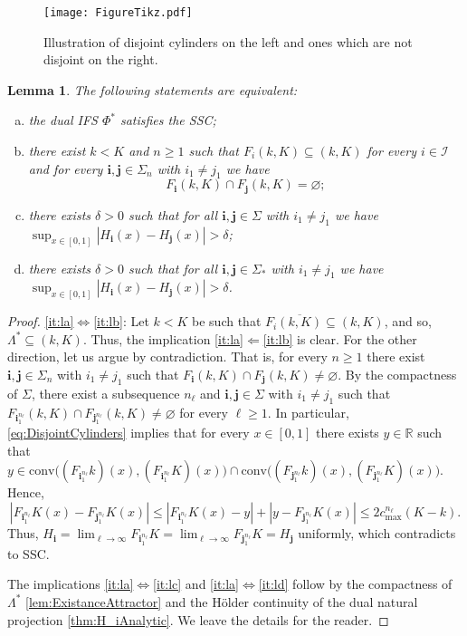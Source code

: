 \documentclass[12pt,]{article}
\def\cref#1{\ref{#1}}%
\newtheorem{lemma}[theorem]{Lemma}
\theoremstyle{definition}
\theoremstyle{remark}
\newcommand{\0}{\mathbf{0}}
\newcommand{\bi}{\mathbf{i}}
\newcommand{\bj}{\mathbf{j}}
\begin{document}
\begin{figure}[t]
\texttt{[image: FigureTikz.pdf]}
\caption{Illustration of disjoint cylinders on the left and ones which are not disjoint on the right.}\label{fig:Cylinders}
\end{figure}

\begin{lemma}\label{lem:SSCEequiv}
The following statements are equivalent: 
\begin{enumerate}[a)]
\item\label{it:la} the dual IFS $\Phi^*$ satisfies the SSC;
\item\label{it:lb} there exist $k<K$ and $n\geq1$ such that $F_{i}(k,K)\subseteq(k,K)$ for every $i\in\mathcal{I}$ and for every $\bi,\bj\in\Sigma_n$ with $i_1\neq j_1$ we have
\begin{equation*}
	F_{\bi}(k,K)\cap F_{\bj}(k,K)=\varnothing; 
\end{equation*}
\item\label{it:lc} there exists $\delta>0$ such that for all $\bi,\bj \in\Sigma$ with $i_1\neq j_1$ we have
  $\sup_{x\in[0,1]} |H_{\bi}(x) - H_{\bj}(x)| > \delta$;
\item\label{it:ld} there exists $\delta>0$ such that for all $\bi,\bj \in\Sigma_*$ with $i_1\neq j_1$ we have
  $\sup_{x\in[0,1]} |H_{\bi}(x) - H_{\bj}(x)| > \delta$.
\end{enumerate}
\end{lemma}


\begin{proof}
	\cref{it:la}$\Leftrightarrow$\cref{it:lb}: Let $k<K$ be such that $F_{i}\overline{(k,K)}\subseteq(k,K)$, and so, $\Lambda^*\subseteq(k,K)$. Thus, the implication \cref{it:la}$\Leftarrow$\cref{it:lb} is clear. For the other direction, let us argue by contradiction. That is, for every $n\geq1$ there exist $\bi,\bj\in\Sigma_n$ with $i_1\neq j_1$ such that $F_{\bi}(k,K)\cap F_{\bj}(k,K)\neq\varnothing$. By the compactness of $\Sigma$, there exist a subsequence $n_\ell$ and $\bi,\bj\in\Sigma$ with $i_1\neq j_1$ such that $F_{\bi_1^{n_\ell}}(k,K)\cap F_{\bj_1^{n_\ell}}(k,K)\neq\varnothing$ for every $\ell\geq1$. In particular, \cref{eq:DisjointCylinders} implies that for every $x\in[0,1]$ there exists $y\in\mathbb{R}$ such that $y\in\mathrm{conv}\big((F_{\bi_1^{n_\ell}}k)(x), (F_{\bi_1^{n_\ell}}K)(x)\big) \cap \mathrm{conv}\big((F_{\bj_1^{n_\ell}}k)(x), (F_{\bj_1^{n_\ell}}K)(x)\big)$. Hence,
	$$
	|F_{\bi_1^{n_\ell}}K(x)-F_{\bj_1^{n_\ell}}K(x)|\leq |F_{\bi_1^{n_\ell}}K(x)-y|+|y-F_{\bj_1^{n_\ell}}K(x)|\leq 2c_{\max}^{n_\ell}(K-k).
	$$
	Thus, $H_{\bi}=\lim_{\ell\to\infty}F_{\bi_1^{n_\ell}}K=\lim_{\ell\to\infty}F_{\bj_1^{n_\ell}}K=H_{\bj}$ uniformly, which contradicts to SSC.
	
	The implications \cref{it:la}$\Leftrightarrow$\cref{it:lc} and \cref{it:la}$\Leftrightarrow$\cref{it:ld} follow by the compactness of $\Lambda^*$ \cref{lem:ExistanceAttractor} and the H\"older continuity of the dual natural projection \cref{thm:H_iAnalytic}. We leave the details for the reader.
\end{proof}
\end{document}
